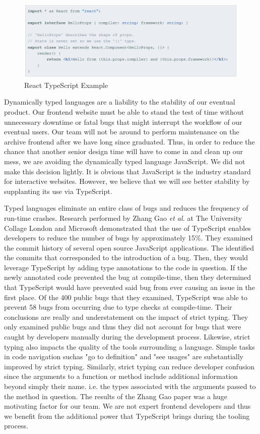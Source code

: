 \documentclass[12pt]{report}
\begin{document}
\begin{figure}[h]
	\centering
	\includegraphics[scale=0.5]{react_typescript_example}
	\caption{React TypeScript Example}
	\label{fig:reacttypescriptexample}
\end{figure}

Dynamically typed languages are a liability to the stability of our eventual product. Our frontend website must be able to stand the test of time without unnecessary downtime or fatal bugs that might interrupt the workflow of our eventual users. Our team will not be around to perform maintenance on the archive frontend after we have long since graduated. Thus, in order to reduce the chance that another senior design time will have to come in and clean up our mess, we are avoiding the dynamically typed language JavaScript. We did not make this decision lightly. It is obvious that JavaScript is the industry standard for interactive websites. However, we believe that we will see better stability by supplanting its use via TypeScript.

Typed languages eliminate an entire class of bugs and reduces the frequency of run-time crashes. Research performed by Zhang Gao \textit{et al.} at The University Collage London and Microsoft demonstrated that the use of TypeScript enables developers to reduce the number of bugs by approximately 15\%.\cite{typescriptpaper} They examined the commit history of several open source JavaScript applications. The identified the commits that corresponded to the introduction of a bug. Then, they would leverage TypeScript by adding type annotations to the code in question. If the newly annotated code prevented the bug at compile-time, then they determined that TypeScript would have prevented said bug from ever causing an issue in the first place. Of the 400 public bugs that they examined, TypeScript was able to prevent 58 bugs from occurring due to type checks at compile-time. Their conclusions are really and understatement on the impact of strict typing. They only examined public bugs and thus they did not account for bugs that were caught by developers manually during the development process. Likewise, strict typing also impacts the quality of the tools surrounding a language. Simple tasks in code navigation suchas "go to definition" and "see usages" are substantially improved by strict typing. Similarly, strict typing can reduce developer confusion since the arguments to a function or method include additional information beyond simply their name. i.e. the types associated with the arguments passed to the method in question. The results of the Zhang Gao paper was a huge motivating factor for our team. We are not expert frontend developers and thus we benefit from the additional power that TypeScript brings during the tooling process.
\end{document}
